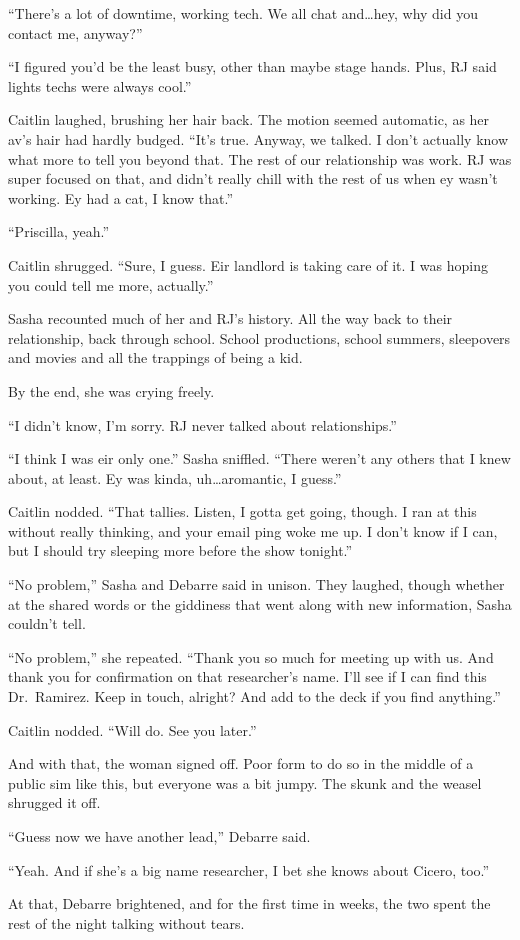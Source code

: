 ``There's a lot of downtime, working tech. We all chat and\ldots{}hey, why did you contact me, anyway?''

``I figured you'd be the least busy, other than maybe stage hands. Plus, RJ said lights techs were always cool.''

Caitlin laughed, brushing her hair back. The motion seemed automatic, as her av's hair had hardly budged. ``It's true. Anyway, we talked. I don't actually know what more to tell you beyond that. The rest of our relationship was work. RJ was super focused on that, and didn't really chill with the rest of us when ey wasn't working. Ey had a cat, I know that.''

``Priscilla, yeah.''

Caitlin shrugged. ``Sure, I guess. Eir landlord is taking care of it. I was hoping you could tell me more, actually.''

Sasha recounted much of her and RJ's history. All the way back to their relationship, back through school. School productions, school summers, sleepovers and movies and all the trappings of being a kid.

By the end, she was crying freely.

``I didn't know, I'm sorry. RJ never talked about relationships.''

``I think I was eir only one.'' Sasha sniffled. ``There weren't any others that I knew about, at least. Ey was kinda, uh\ldots{}aromantic, I guess.''

Caitlin nodded. ``That tallies. Listen, I gotta get going, though. I ran at this without really thinking, and your email ping woke me up. I don't know if I can, but I should try sleeping more before the show tonight.''

``No problem,'' Sasha and Debarre said in unison. They laughed, though whether at the shared words or the giddiness that went along with new information, Sasha couldn't tell.

``No problem,'' she repeated. ``Thank you so much for meeting up with us. And thank you for confirmation on that researcher's name. I'll see if I can find this Dr.~Ramirez. Keep in touch, alright? And add to the deck if you find anything.''

Caitlin nodded. ``Will do. See you later.''

And with that, the woman signed off. Poor form to do so in the middle of a public sim like this, but everyone was a bit jumpy. The skunk and the weasel shrugged it off.

``Guess now we have another lead,'' Debarre said.

``Yeah. And if she's a big name researcher, I bet she knows about Cicero, too.''

At that, Debarre brightened, and for the first time in weeks, the two spent the rest of the night talking without tears.
